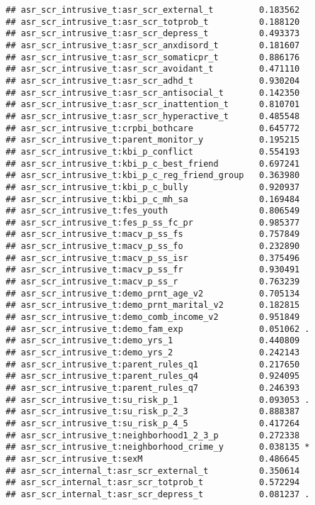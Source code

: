 \documentclass[
]{article}
\begin{document}
\begin{verbatim}
## asr_scr_intrusive_t:asr_scr_external_t         0.183562    
## asr_scr_intrusive_t:asr_scr_totprob_t          0.188120    
## asr_scr_intrusive_t:asr_scr_depress_t          0.493373    
## asr_scr_intrusive_t:asr_scr_anxdisord_t        0.181607    
## asr_scr_intrusive_t:asr_scr_somaticpr_t        0.886176    
## asr_scr_intrusive_t:asr_scr_avoidant_t         0.471110    
## asr_scr_intrusive_t:asr_scr_adhd_t             0.930204    
## asr_scr_intrusive_t:asr_scr_antisocial_t       0.142350    
## asr_scr_intrusive_t:asr_scr_inattention_t      0.810701    
## asr_scr_intrusive_t:asr_scr_hyperactive_t      0.485548    
## asr_scr_intrusive_t:crpbi_bothcare             0.645772    
## asr_scr_intrusive_t:parent_monitor_y           0.195215    
## asr_scr_intrusive_t:kbi_p_conflict             0.554193    
## asr_scr_intrusive_t:kbi_p_c_best_friend        0.697241    
## asr_scr_intrusive_t:kbi_p_c_reg_friend_group   0.363980    
## asr_scr_intrusive_t:kbi_p_c_bully              0.920937    
## asr_scr_intrusive_t:kbi_p_c_mh_sa              0.169484    
## asr_scr_intrusive_t:fes_youth                  0.806549    
## asr_scr_intrusive_t:fes_p_ss_fc_pr             0.985377    
## asr_scr_intrusive_t:macv_p_ss_fs               0.757849    
## asr_scr_intrusive_t:macv_p_ss_fo               0.232890    
## asr_scr_intrusive_t:macv_p_ss_isr              0.375496    
## asr_scr_intrusive_t:macv_p_ss_fr               0.930491    
## asr_scr_intrusive_t:macv_p_ss_r                0.763239    
## asr_scr_intrusive_t:demo_prnt_age_v2           0.705134    
## asr_scr_intrusive_t:demo_prnt_marital_v2       0.182815    
## asr_scr_intrusive_t:demo_comb_income_v2        0.951849    
## asr_scr_intrusive_t:demo_fam_exp               0.051062 .  
## asr_scr_intrusive_t:demo_yrs_1                 0.440809    
## asr_scr_intrusive_t:demo_yrs_2                 0.242143    
## asr_scr_intrusive_t:parent_rules_q1            0.217650    
## asr_scr_intrusive_t:parent_rules_q4            0.924095    
## asr_scr_intrusive_t:parent_rules_q7            0.246393    
## asr_scr_intrusive_t:su_risk_p_1                0.093053 .  
## asr_scr_intrusive_t:su_risk_p_2_3              0.888387    
## asr_scr_intrusive_t:su_risk_p_4_5              0.417264    
## asr_scr_intrusive_t:neighborhood1_2_3_p        0.272338    
## asr_scr_intrusive_t:neighborhood_crime_y       0.038135 *  
## asr_scr_intrusive_t:sexM                       0.486645    
## asr_scr_internal_t:asr_scr_external_t          0.350614    
## asr_scr_internal_t:asr_scr_totprob_t           0.572294    
## asr_scr_internal_t:asr_scr_depress_t           0.081237 .  

\end{verbatim}
\end{document}
